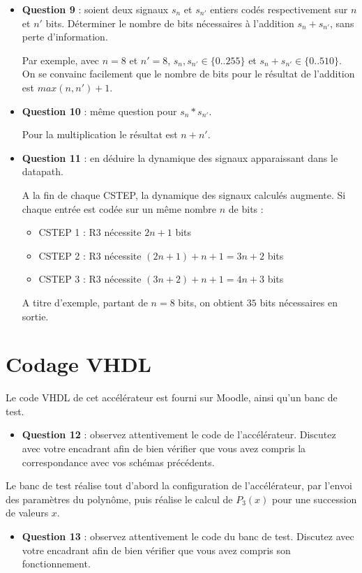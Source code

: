 \documentclass[a4paper,11pt]{exam}
\begin{document}
\begin{itemize}
  \item \textbf{Question 9} : soient deux signaux $s_n$ et $s_{n'}$ entiers codés respectivement sur $n$ et $n'$ bits. Déterminer le nombre de bits nécessaires à l'addition $s_n+s_{n'}$, sans perte d'information.
  \begin{solution}
    Par exemple, avec $n=8$ et $n'=8$, $s_n,s_{n'} \in \{0..255\}$ et $s_n+s_{n'} \in \{0..510\}$. On se convainc facilement que le nombre de bits pour le résultat de l'addition est $max(n,n')+1$.
  \end{solution}
  \item \textbf{Question 10} : même question pour $s_n*s_{n'}$.
  \begin{solution}
    Pour la multiplication le résultat est $n+n'$.
  \end{solution}
  \item \textbf{Question 11} : en déduire la dynamique des signaux apparaissant dans le datapath.
  \begin{solution}
A la fin de chaque CSTEP, la dynamique des signaux calculés augmente. Si chaque entrée est codée sur un même nombre $n$ de bits :
  \begin{itemize}
    \item CSTEP 1 : R3 nécessite $2n+1$ bits
    \item CSTEP 2 : R3 nécessite $(2n+1)+n+1=3n+2$ bits
    \item CSTEP 3 : R3 nécessite $(3n+2)+n+1=4n+3$ bits
  \end{itemize}
  A titre d'exemple, partant de $n=8$ bits, on obtient $35$ bits nécessaires en sortie.
  \end{solution}
\end{itemize}

\section{Codage VHDL}

Le code VHDL de cet accélérateur est fourni sur Moodle, ainsi qu'un banc de test.

\begin{itemize}
  \item \textbf{Question 12} : observez attentivement le code de l'accélérateur. Discutez avec votre encadrant afin de bien vérifier que vous avez compris la correspondance avec vos schémas précédents.
\end{itemize}

Le banc de test réalise tout d'abord la configuration de l'accélérateur, par l'envoi des paramètres du polynôme, puis réalise le calcul de $P_3(x)$ pour une succession de valeurs $x$.

\begin{itemize}
  \item \textbf{Question 13} : observez attentivement le code du banc de test. Discutez avec votre encadrant afin de bien vérifier que vous avez compris son fonctionnement.
\end{itemize}
\end{document}
